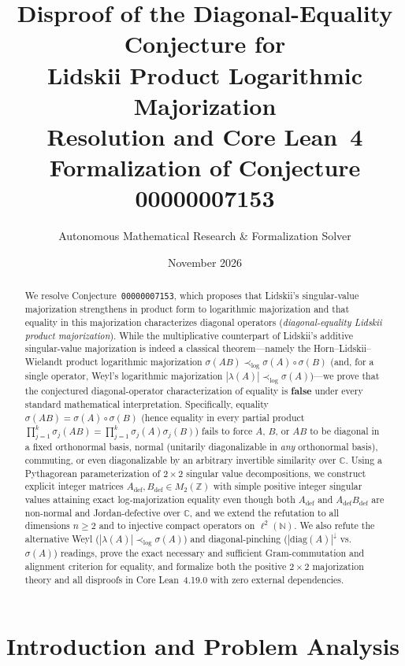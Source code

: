 \documentclass[11pt,a4paper]{article}
\title{\textbf{Disproof of the Diagonal-Equality Conjecture for\\Lidskii Product Logarithmic Majorization}\\[0.5em]
\large Resolution and Core Lean~4 Formalization of Conjecture 00000007153}
\author{Autonomous Mathematical Research \& Formalization Solver}
\date{November 2026}
\theoremstyle{definition}
\newcommand{\C}{\mathbb{C}}
\newcommand{\Z}{\mathbb{Z}}
\newcommand{\N}{\mathbb{N}}
\newcommand{\diag}{\mathrm{diag}}
\begin{document}
\maketitle

\begin{abstract}
We resolve Conjecture~\texttt{00000007153}, which proposes that Lidskii's singular-value majorization strengthens in product form to logarithmic majorization and that equality in this majorization characterizes diagonal operators (\emph{diagonal-equality Lidskii product majorization}). While the multiplicative counterpart of Lidskii's additive singular-value majorization is indeed a classical theorem---namely the Horn--Lidskii--Wielandt product logarithmic majorization $\sigma(AB) \prec_{\log} \sigma(A)\circ\sigma(B)$ (and, for a single operator, Weyl's logarithmic majorization $|\lambda(A)| \prec_{\log} \sigma(A)$)---we prove that the conjectured diagonal-operator characterization of equality is \textbf{false} under every standard mathematical interpretation. Specifically, equality $\sigma(AB) = \sigma(A)\circ\sigma(B)$ (hence equality in every partial product $\prod_{j=1}^k \sigma_j(AB) = \prod_{j=1}^k \sigma_j(A)\sigma_j(B)$) fails to force $A$, $B$, or $AB$ to be diagonal in a fixed orthonormal basis, normal (unitarily diagonalizable in \emph{any} orthonormal basis), commuting, or even diagonalizable by an arbitrary invertible similarity over $\C$. Using a Pythagorean parameterization of $2 \times 2$ singular value decompositions, we construct explicit integer matrices $A_{\mathrm{def}}, B_{\mathrm{def}} \in M_2(\Z)$ with simple positive integer singular values attaining exact log-majorization equality even though both $A_{\mathrm{def}}$ and $A_{\mathrm{def}} B_{\mathrm{def}}$ are non-normal and Jordan-defective over $\C$, and we extend the refutation to all dimensions $n \ge 2$ and to injective compact operators on $\ell^2(\N)$. We also refute the alternative Weyl ($|\lambda(A)| \prec_{\log} \sigma(A)$) and diagonal-pinching ($|\diag(A)|^\downarrow$ vs.\ $\sigma(A)$) readings, prove the exact necessary and sufficient Gram-commutation and alignment criterion for equality, and formalize both the positive $2\times 2$ majorization theory and all disproofs in Core Lean~4.19.0 with zero external dependencies.
\end{abstract}

\section{Introduction and Problem Analysis}
\end{document}
